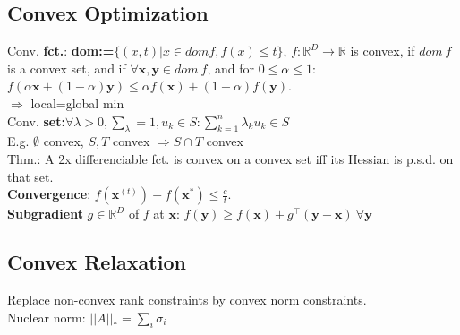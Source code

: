 \subsection*{Convex Optimization}
Conv. \textbf{fct.}: \textbf{dom:=}$\{(x,t)|x \in dom f, f(x) \leq t\}$, $f : \mathbb{R}^D \rightarrow \mathbb{R}$ is convex, if $dom\ f$ is a convex set, and if $\forall \mathbf{x}, \mathbf{y} \in dom\ f$, and for $0 \leq \alpha \leq 1$: $f(\alpha \mathbf{x} + (1 - \alpha)\mathbf{y}) \leq \alpha f(\mathbf{x}) + (1-\alpha)f(\mathbf{y})$.\\
$\Rightarrow$ local=global min\\
Conv. \textbf{set:}$\forall \lambda >0, \sum_\lambda = 1, u_k\in S: \sum_{k=1}^{n}\lambda_k u_k \in S$\\
E.g. $\emptyset$ convex, $S, T$ convex $\Rightarrow S\cap T$ convex\\
Thm.: A 2x differenciable fct. is convex on a convex set iff its Hessian is p.s.d. on that set.\\
\textbf{Convergence}: $f(\mathbf{x}^{(t)}) - f(\mathbf{x}^*) \le \frac{c}{t}$.\\
\textbf{Subgradient} $g \in \mathbb{R}^D$ of $f$ at $\mathbf{x}$: $f(\mathbf{y}) \geq f(\mathbf{x}) + g^\top(\mathbf{y}-\mathbf{x}) \ \forall \mathbf{y}$

\subsection*{Convex Relaxation}
Replace non-convex rank constraints by convex norm constraints.\\
Nuclear norm: $||A||_* = \sum_i \sigma_i$
